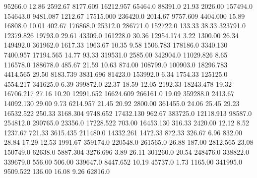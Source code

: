 95266.0 12.86 2592.67 8177.609 16212.957 65464.0 88391.0 21.93 2026.00 157494.0 
154643.0 9481.087 1212.67 17515.000 236420.0 2014.67 9757.609 4404.000 15.89 16808.0 
10.01 402.67 176868.0 25312.0 286771.0 152722.0 133.33 38.33 323791.0 12379.826 
19793.0 29.61 43309.0 161228.0 30.36 12954.174 3.22 1300.00 26.34 149492.0 
361962.0 1617.33 1963.67 10.35 9.58 1506.783 178186.0 3340.130 7400.957 17194.565 
14.77 93.33 319531.0 2585.00 342904.0 11029.826 8.65 116578.0 188678.0 485.67 
21.59 10.63 874.00 108799.0 100903.0 18296.783 4414.565 29.50 8183.739 3831.696 
81423.0 153992.0 6.34 1754.33 125125.0 4554.217 341625.0 6.39 399872.0 22.37 
18.59 12.05 2192.33 18243.478 19.32 16706.217 27.16 10.20 12991.652 16624.609 
266161.0 19.09 359288.0 2413.67 14092.130 29.00 9.73 6214.957 21.45 20.92 
2800.00 361455.0 24.06 25.45 29.23 16532.522 250.33 3168.304 9748.652 17432.130 
962.67 383725.0 12118.913 98587.0 254812.0 290765.0 23356.0 17228.522 703.00 16453.130 
316.33 2420.00 12.12 8.52 1237.67 721.33 3615.435 211480.0 14332.261 1472.33 
872.33 326.67 6.96 832.00 28.84 17.29 12.53 1991.67 359174.0 220548.0 
261565.0 26.88 187.00 2812.565 23.08 150749.0 62638.0 5887.304 3276.696 3.89 
26.11 301260.0 20.54 248476.0 338822.0 339679.0 556.00 506.00 339647.0 8447.652 
10.19 45737.0 1.73 1165.00 341995.0 9509.522 136.00 16.08 9.26 62816.0
